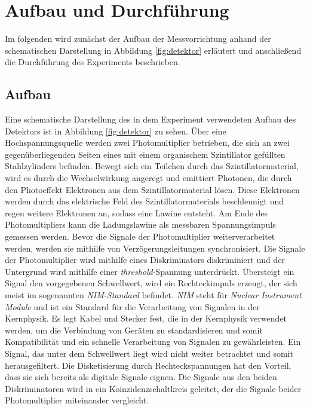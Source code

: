 \section{Aufbau und Durchführung}\label{sec:AufbauDurchfuehrung}

Im folgenden wird zunächst der Aufbau der Messvorrichtung anhand der schematischen Darstellung in Abbildung \ref{fig:detektor} erläutert und anschließend die Durchführung des Experiments beschrieben.

\subsection{Aufbau}\label{subsec:Aufbau}
Eine schematische Darstellung des in dem Experiment verwendeten Aufbau des Detektors ist in Abbildung \ref{fig:detektor} zu sehen.
Über eine Hochspannungsquelle werden zwei Photomultiplier betrieben, die sich an zwei gegenüberliegenden Seiten eines mit einem organischem Szintillator gefüllten Stahlzylinders befinden.
Bewegt sich ein Teilchen durch das Szintillatormaterial, wird es durch die Wechselwirkung angeregt und emittiert Photonen, die durch den Photoeffekt Elektronen aus dem Szintillatormaterial lösen.
Diese Elektronen werden durch das elektrische Feld des Szintillatormaterials beschleunigt und regen weitere Elektronen an, sodass eine Lawine entsteht.
Am Ende des Photomultipliers kann die Ladungslawine als messbaren Spannungsimpuls gemessen werden. \newline
Bevor die Signale der Photomultiplier weiterverarbeitet werden, werden sie mithilfe von Verzögerungsleitungen synchronisiert.
Die Signale der Photomultiplier wird mithilfe eines Diskriminators diskriminiert und der Untergrund wird mithilfe einer \textit{threshold}-Spannung unterdrückt.
Übersteigt ein Signal den vorgegebenen Schwellwert, wird ein Rechteckimpuls erzeugt, der sich meist im sogenannten \textit{NIM-Standard} befindet. %
\textit{NIM} steht für \textit{Nuclear Instrument Module} und ist ein Standard für die Verarbeitung von Signalen in der Kernphysik.
Es legt Kabel und Stecker fest, die in der Kernphysik verwendet werden, um die Verbindung von Geräten zu standardisieren und somit Kompatibilität und ein schnelle Verarbeitung von Signalen zu gewährleisten.
Ein Signal, das unter dem Schwellwert liegt wird nicht weiter betrachtet und somit herausgefiltert.
Die Disketisierung durch Rechteckspannungen hat den Vorteil, dass sie sich bereits als digitale Signale eignen.\newline
Die Signale aus den beiden Diskriminatoren wird in ein Koinzidenzschaltkreis geleitet, der die Signale beider Photomultiplier miteinander vergleicht.
